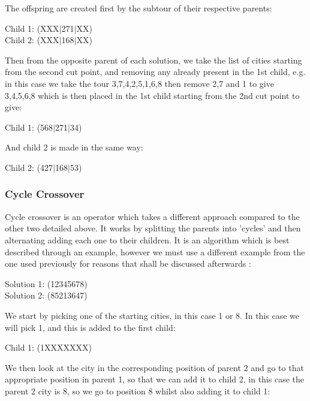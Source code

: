 \documentclass[11pt,a4paper,titlepage]{article}
\begin{document}
The offspring are created first by the subtour of their respective parents:

\begin{center}\Large
Child 1: (XXX$|$271$|$XX)\\
Child 2: (XXX$|$168$|$XX)
\end{center}

Then from the opposite parent of each solution, we take the list of cities starting from the second cut point, and removing any already present in the 1st child, e.g. in this case we take the tour 3,7,4,2,5,1,6,8 then remove 2,7 and 1 to give 3,4,5,6,8 which is then placed in the 1st child starting from the 2nd cut point to give:

\begin{center}\Large
Child 1: (568$|$271$|$34)
\end{center}

And child 2 is made in the same way:

\begin{center}\Large
Child 2: (427$|$168$|$53)
\end{center}

\subsubsection{Cycle Crossover}

Cycle crossover is an operator which takes a different approach compared to the other two detailed above. It works by splitting the parents into 'cycles' and then alternating adding each one to their children. It is an algorithm which is best described through an example, however we must use a different example from the one used previously for reasons that shall be discussed afterwards \cite{GACrossover}:

\begin{center}\Large
Solution 1: (12345678)\\
Solution 2: (85213647)
\end{center}

We start by picking one of the starting cities, in this case 1 or 8. In this case we will pick 1, and this is added to the first child:

\begin{center}\Large
Child 1: (1XXXXXXX)\\
\end{center}

We then look at the city in the corresponding position of parent 2 and go to that appropriate position in parent 1, so that we can add it to child 2, in this case the parent 2 city is 8, so we go to position 8 whilst also adding it to child 1:
\end{document}
